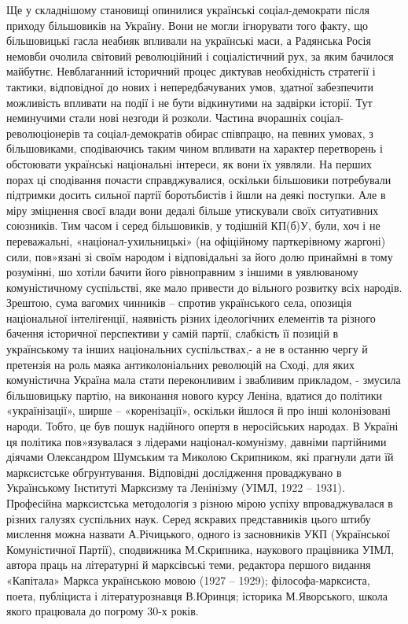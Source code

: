 \documentclass{kapital}
\begin{document}
	Ще у складнішому становищі опинилися українські соціал-демократи після  приходу більшовиків на Україну. Вони не могли ігнорувати того факту, що більшовицькі гасла неабияк впливали на українські маси, а Радянська Росія немовби очолила світовий революційний і соціалістичний рух, за яким бачилося майбутнє.  Невблаганний історичний процес диктував необхідність стратегії і тактики, відповідної до нових і непередбачуваних умов, здатної забезпечити можливість впливати на події і не бути відкинутими на задвірки історії. Тут неминучими стали нові незгоди й розколи. Частина вчорашніх соціал-революціонерів та соціал-демократів обирає співпрацю, на певних умовах, з більшовиками, сподіваючись таким чином впливати на характер перетворень і обстоювати українські національні інтереси, як вони їх уявляли. На перших порах ці сподівання почасти справджувалися, оскільки більшовики потребували підтримки досить сильної партії боротьбистів і йшли на деякі поступки. Але в міру зміцнення своєї влади вони  дедалі більше утискували своїх ситуативних союзників. Тим часом і серед більшовиків, у тодішній КП(б)У, були, хоч і не переважальні, «націонал-ухильницькі» (на офіційному парткерівному жаргоні) сили, пов»язані зі своїм народом і відповідальні за його долю принаймні в тому розумінні, шо хотіли бачити його рівноправним з іншими в уявлюваному комуністичному суспільстві, яке мало привести до вільного розвитку всіх народів. Зрештою, сума вагомих чинників – спротив українського села, опозиція національної інтелігенції, наявність різних ідеологічних елементів та різного бачення історичної перспективи у самій партії, слабкість її позицій в українському та інших національних суспільствах,- а не в останню чергу й претензія  на роль маяка антиколоніальних революцій на Сході, для  яких комуністична Україна мала стати переконливим і звабливим прикладом, - змусила більшовицьку партію, на виконання нового курсу Леніна, вдатися до  політики «українізації», ширше – «коренізації», оскільки йшлося й про інші колонізовані народи. Тобто, це був пошук надійного опертя в неросійських народах. В Україні ця політика пов»язувалася з лідерами націонал-комунізму, давніми партійними діячами Олександром Шумським та  Миколою Скрипником, які прагнули дати їй марксистське обгрунтування. Відповідні дослідження проваджувано в Українському Інституті Марксизму та Ленінізму (УІМЛ, 1922 – 1931). Професійна марксистська методологія з різною мірою успіху впроваджувалася в різних галузях суспільних наук. Серед яскравих представників цього штибу мислення  можна назвати А.Річицького, одного із засновників УКП (Української Комуністичної Партії), сподвижника М.Скрипника, наукового працівника УІМЛ, автора праць на літературні й марксівські теми, редактора першого видання «Капітала» Маркса українською мовою (1927 – 1929); філософа-марксиста, поета, публіциста і літературознавця  В.Юринця; історика М.Яворського, школа якого  працювала до погрому 30-х років.              
 
\end{document}
